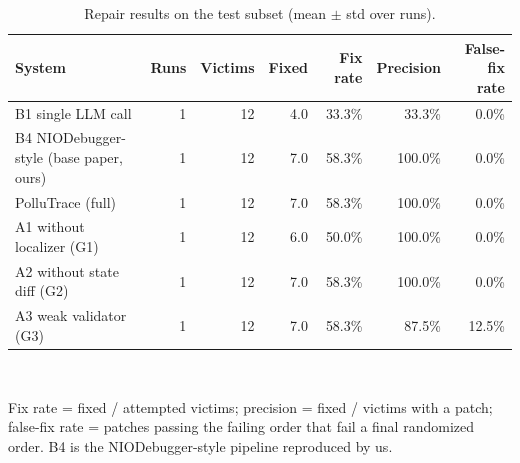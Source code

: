 \begin{table}[t]
\centering
\footnotesize
\caption{Repair results on the test subset (mean $\pm$ std over runs).}
\label{tab:main}
\begin{tabular}{lrrrrrr}
\toprule
\textbf{System} & \textbf{Runs} & \textbf{Victims} & \textbf{Fixed} & \textbf{Fix rate} & \textbf{Precision} & \textbf{False-fix rate} \\
\midrule
B1 single LLM call & 1 & 12 & 4.0 & 33.3\% & 33.3\% & 0.0\% \\
B4 NIODebugger-style (base paper, ours) & 1 & 12 & 7.0 & 58.3\% & 100.0\% & 0.0\% \\
PolluTrace (full) & 1 & 12 & 7.0 & 58.3\% & 100.0\% & 0.0\% \\
A1 without localizer (G1) & 1 & 12 & 6.0 & 50.0\% & 100.0\% & 0.0\% \\
A2 without state diff (G2) & 1 & 12 & 7.0 & 58.3\% & 100.0\% & 0.0\% \\
A3 weak validator (G3) & 1 & 12 & 7.0 & 58.3\% & 87.5\% & 12.5\% \\
\bottomrule
\end{tabular}
\\[2pt]\parbox{0.95\textwidth}{\scriptsize Fix rate = fixed / attempted victims; precision = fixed / victims with a patch; false-fix rate = patches passing the failing order that fail a final randomized order. B4 is the NIODebugger-style pipeline reproduced by us.}
\end{table}
